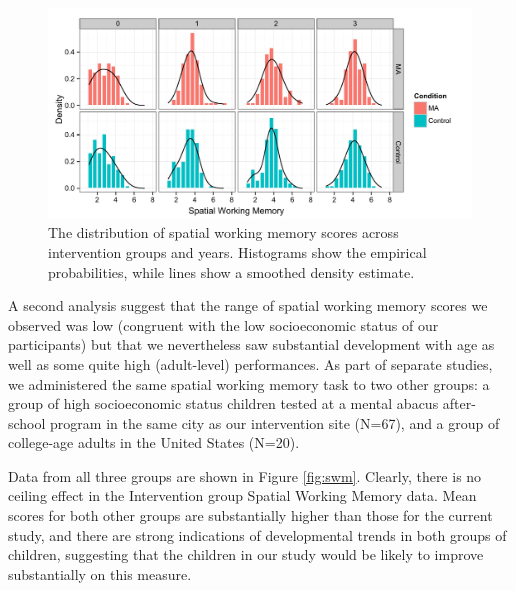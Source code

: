 \documentclass[11pt]{article}
\begin{document}
\begin{figure}[H]
\begin{center}
\includegraphics[width=6.5in]{figures/swmdensities.pdf}
\end{center}
\caption{The distribution of spatial working memory scores across intervention groups and years. Histograms show the empirical probabilities, while lines show a smoothed density estimate.}
\label{fig:densities}
\end{figure}

A second analysis suggest that the range of spatial working memory scores we observed was low (congruent with the low socioeconomic status of our participants) but that we nevertheless saw substantial development with age as well as some quite high (adult-level) performances. As part of separate studies, we administered the same spatial working memory task to two other groups: a group of high socioeconomic status children tested at a mental abacus after-school program in the same city as our intervention site (N=67), and a group of college-age adults in the United States (N=20).

Data from all three groups are shown in Figure \ref{fig:swm}. Clearly, there is no ceiling effect in the Intervention group Spatial Working Memory data. Mean scores for both other groups are substantially higher than those for the current study, and there are strong indications of developmental trends in both groups of children, suggesting that the children in our study would be likely to improve substantially on this measure.
\end{document}
